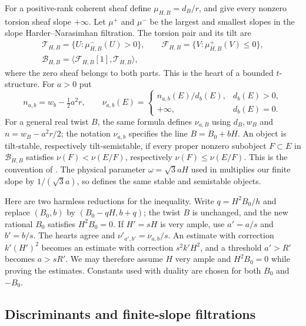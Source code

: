 For a positive-rank coherent sheaf define
$\mu_{H,B}=d_B/r$, and give every nonzero torsion sheaf slope
$+\infty$.  Let $\mu^+$ and $\mu^-$ be the largest and smallest slopes
in the slope Harder--Narasimhan filtration.  The torsion pair and its tilt
are
\begin{equation}\label{eq:first-tilt}
\begin{gathered}
 \mathcal T_{H,B}=\{U:\mu^-_{H,B}(U)>0\},\qquad
 \mathcal F_{H,B}=\{V:\mu^+_{H,B}(V)\le0\},\\
 \mathcal B_{H,B}=\langle\mathcal F_{H,B}[1],\mathcal T_{H,B}\rangle,
\end{gathered}
\end{equation}
where the zero sheaf belongs to both parts.  This is the heart of a
bounded $t$-structure.  For $a>0$ put
\begin{equation}\label{eq:tilt-numerator}
 n_{a,b}=w_b-\tfrac12a^2r,\qquad
 \nu_{a,b}(E)=
 \begin{cases}n_{a,b}(E)/d_b(E),&d_b(E)>0,\\
 +\infty,&d_b(E)=0.
 \end{cases}
\end{equation}
For a general real twist $B$, the same formula defines
$\nu_{a,B}$ using $d_B,w_B$ and $n=w_B-a^2r/2$; the notation
$\nu_{a,b}$ specifies the line $B=B_0+bH$.
An object is tilt-stable, respectively tilt-semistable, if every proper
nonzero subobject $F\subset E$ in $\mathcal B_{H,B}$ satisfies
$\nu(F)<\nu(E/F)$, respectively $\nu(F)\le\nu(E/F)$.
This is the convention of \cite[Definition~2.3]{BMS2016}.
The physical parameter $\omega=\sqrt3aH$ used in
\cite{BMT2014,BMS2016} multiplies our finite slope by $1/(\sqrt3a)$,
so defines the same stable and semistable objects.

Here are two harmless reductions for the inequality.  Write
$q=H^2B_0/h$ and replace $(B_0,b)$ by $(B_0-qH,b+q)$; the twist
$B$ is unchanged, and the new rational $B_0$ satisfies $H^2B_0=0$.
If $H'=sH$ is very ample, use $a'=a/s$ and $b'=b/s$.
The hearts agree and $\nu'_{a',b'}=\nu_{a,b}/s$.  An estimate with
correction $k'(H')^2$ becomes an estimate with correction
$s^2k'H^2$, and a threshold $a'>R'$ becomes $a>sR'$.
We may therefore assume $H$ very ample and $H^2B_0=0$ while proving
the estimates.  Constants used with duality are chosen for both $B_0$
and $-B_0$.

\subsection{Discriminants and finite-slope filtrations}

